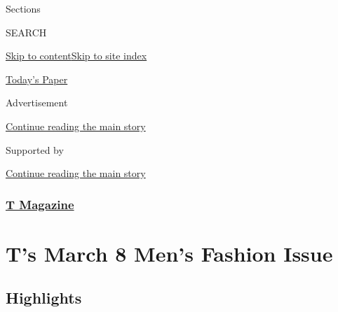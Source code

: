 Sections

SEARCH

\protect\hyperlink{site-content}{Skip to
content}\protect\hyperlink{site-index}{Skip to site index}

\href{https://myaccount.nytimes.com/auth/login?response_type=cookie\&client_id=vi}{}

\href{https://www.nytimes.com/section/todayspaper}{Today's Paper}

Advertisement

\protect\hyperlink{after-top}{Continue reading the main story}

Supported by

\protect\hyperlink{after-sponsor}{Continue reading the main story}

\hypertarget{t-magazine}{%
\subsubsection{\texorpdfstring{\href{/section/t-magazine}{T
Magazine}}{T Magazine}}\label{t-magazine}}

\hypertarget{ts-march-8-mens-fashion-issue}{%
\section{T's March 8 Men's Fashion
Issue}\label{ts-march-8-mens-fashion-issue}}

\hypertarget{highlights}{%
\subsection{Highlights}\label{highlights}}

